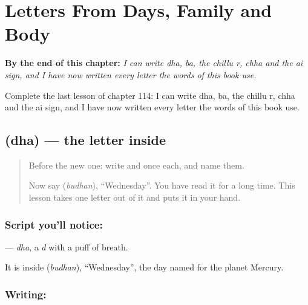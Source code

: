 
\chapter{Letters From Days, Family and Body}
\label{ch:ml-letters-days-family-body}

\begin{chapteropening}
\textbf{By the end of this chapter:} \emph{I can write dha, ba, the chillu r, chha and the ai sign, and I have now written every letter the words of this book use.}

Complete the last lesson of chapter 114: I can write dha, ba, the chillu r, chha and the ai sign, and I have now written every letter the words of this book use.
\end{chapteropening}

\section[\texorpdfstring{\ml{ധ} (dha)}{ധ (dha)}]{ (dha) — the letter inside }

\label{lesson:ML-W114-dha}



\begin{quote}
Before the new one: write  and  once each, and name them.

Now say \textbf{} (\emph{budhan}), \textquotedblleft{}Wednesday\textquotedblright{}. You have read it for a long time. This lesson takes one letter out of it and puts it in your hand.
\end{quote}

\subsection*{Script you'll notice: }
\textbf{} — \emph{dha}, a \emph{d} with a puff of breath.

It is inside \textbf{} (\emph{budhan}), \textquotedblleft{}Wednesday\textquotedblright{}, the day named for the planet Mercury.

\subsection*{Writing: }


